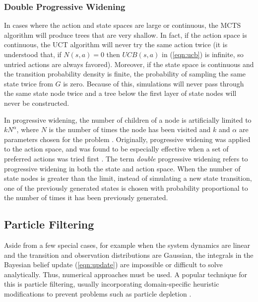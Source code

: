 \subsubsection{Double Progressive Widening} \label{sec:dpw}

In cases where the action and state spaces are large or continuous, the MCTS algorithm will produce trees that are very shallow.
In fact, if the action space is continuous, the UCT algorithm will never try the same action twice (it is understood that, if $N(s,a) = 0$ then $UCB(s,a)$ in (\ref{eqn:ucb}) is infinite, so untried actions are always favored).
Moreover, if the state space is continuous and the transition probability density is finite, the probability of sampling the same state twice from $G$ is zero.
Because of this, simulations will never pass through the same state node twice and a tree below the first layer of state nodes will never be constructed.

In progressive widening, the number of children of a node is artificially limited to $k N^\alpha$, where $N$ is the number of times the node has been visited and $k$ and $\alpha$ are parameters chosen for the problem \cite{couetoux2011double}.
Originally, progressive widening was applied to the action space, and was found to be especially effective when a set of preferred actions was tried first \cite{browne2012survey}.
The term \emph{double} progressive widening refers to progressive widening in both the state and action space.
When the number of state nodes is greater than the limit, instead of simulating a new state transition, one of the previously generated states is chosen with probability proportional to the number of times it has been previously generated.


\subsection{Particle Filtering} \label{sec:particle}

Aside from a few special cases, for example when the system dynamics are linear and the transition and observation distributions are Gaussian, the integrals in the Bayesian belief update (\ref{eqn:update}) are impossible or difficult to solve analytically.
Thus, numerical approaches must be used.
A popular technique for this is particle filtering, usually incorporating domain-specific heuristic modifications to prevent problems such as particle depletion \cite{thrun2005probabilistic}.

